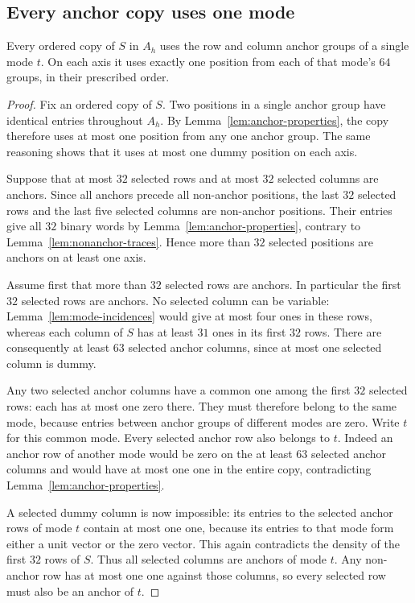 \subsection{Every anchor copy uses one mode}

\begin{lemma}
\label{lem:anchor-rigidity}
Every ordered copy of $S$ in $A_h$ uses the row and column anchor
groups of a single mode $t$. On each axis it uses exactly one position
from each of that mode's $64$ groups, in their prescribed order.
\end{lemma}

\begin{proof}
Fix an ordered copy of $S$. Two positions in a single anchor group
have identical entries throughout $A_h$. By
Lemma~\ref{lem:anchor-properties}, the copy therefore uses at most
one position from any one anchor group. The same reasoning shows
that it uses at most one dummy position on each axis.

Suppose that at most $32$ selected rows and at most $32$ selected
columns are anchors. Since all anchors precede all non-anchor
positions, the last $32$ selected rows and the last five selected
columns are non-anchor positions. Their entries give all $32$ binary
words by Lemma~\ref{lem:anchor-properties}, contrary to
Lemma~\ref{lem:nonanchor-traces}. Hence more than $32$ selected
positions are anchors on at least one axis.

Assume first that more than $32$ selected rows are anchors. In
particular the first $32$ selected rows are anchors. No selected
column can be variable: Lemma~\ref{lem:mode-incidences} would give
at most four ones in these rows, whereas each column of $S$ has at
least $31$ ones in its first $32$ rows. There are consequently at
least $63$ selected anchor columns, since at most one selected
column is dummy.

Any two selected anchor columns have a common one among the first
$32$ selected rows: each has at most one zero there. They must
therefore belong to the same mode, because entries between anchor
groups of different modes are zero. Write $t$ for this common mode.
Every selected anchor row also belongs to $t$. Indeed an anchor row
of another mode would be zero on the at least $63$ selected anchor
columns and would have at most one one in the entire copy,
contradicting Lemma~\ref{lem:anchor-properties}.

A selected dummy column is now impossible: its entries to the
selected anchor rows of mode $t$ contain at most one one, because
its entries to that mode form either a unit vector or the zero
vector. This again contradicts the density of the first $32$ rows
of $S$. Thus all selected columns are anchors of mode $t$. Any
non-anchor row has at most one one against those columns, so every
selected row must also be an anchor of $t$.


\end{proof}
